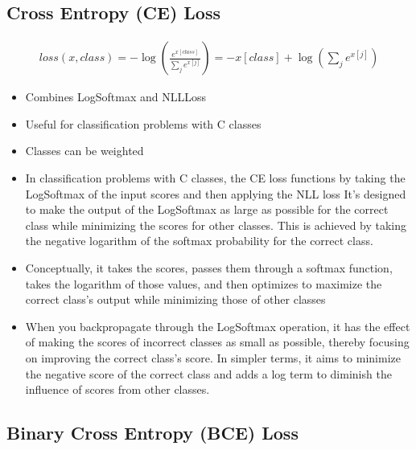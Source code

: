 \documentclass[11pt]{article}
\begin{document}
\subsection{Cross Entropy (CE) Loss}

\begin{definition}\label{eq:cross-entropy-loss}
    \begin{align*}
        loss(x, class) = -\log(\frac{e^{x[class]}}{\sum_j e^{x[j]}}) = -x[class] + \log(\sum_j e^{x[j]})
    \end{align*}
\end{definition}

\begin{itemize}
    \item Combines LogSoftmax and NLLLoss
    \item Useful for classification problems with C classes
    \item Classes can be weighted
    \item In classification problems with C classes, the CE loss functions by taking the LogSoftmax of the input scores and then applying the NLL loss  It's designed to make the output of
    the LogSoftmax as large as possible for the correct class while minimizing the scores for other classes. This is achieved by taking the negative logarithm of the softmax probability for the correct class. 
    \item  Conceptually, it takes the scores, passes them through a softmax function, takes the logarithm of those values, and then optimizes to maximize the correct class's output while minimizing those of other classes
    \item When you backpropagate through the LogSoftmax operation, it has the effect of making the scores of incorrect classes as small as possible, thereby focusing on improving the correct class's score. In simpler terms, it aims to minimize the negative score of the correct class and adds a log term to diminish the influence of scores from other classes.
\end{itemize}

\subsection{Binary Cross Entropy (BCE) Loss}
\end{document}
